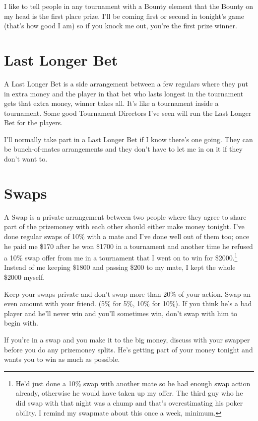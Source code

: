 I like to tell people in any tournament with a Bounty element that the
Bounty on my head is the first place prize. I'll be coming
first or second in tonight's game (that's how good I am) so if you
knock me out, you're the first prize winner.

\section{Last Longer Bet}

A Last Longer Bet is a side arrangement between a few regulars
where they put in extra money and the player
in that bet who lasts longest in the tournament gets that extra
money, winner takes all. It's like a tournament inside a tournament.
Some good Tournament Directors I've seen
will run the Last Longer Bet for the players.

I'll normally take part in a Last Longer Bet if I know there's one
going. They can be bunch-of-mates arrangements and
they don't have to let me in on it if they don't want to.

\section{Swaps}

A Swap is a private arrangement between two people where they
agree to share part of the prizemoney with each other should
either make money tonight. I've done regular swaps of 10\% with a mate and
I've done well out of them too; once he paid me
\$170 after he won \$1700 in a tournament and another time
he refused a 10\% swap offer from me in a tournament that I
went on to win for \$2000.\footnote{He'd
just done a 10\% swap with another mate so he had enough swap action
already, otherwise he would have taken up my offer. The third
guy who he did swap with that night was a chump and that's
overestimating his poker ability. I remind my swapmate about this once
a week, minimum.} Instead of me keeping \$1800 and passing \$200 to my
mate, I kept the whole \$2000 myself.

Keep your swaps private and don't swap more than 20\% of your action.
Swap an even amount with your friend. (5\% for 5\%, 10\% for 10\%).
If you think he's a bad player and he'll never win and
you'll sometimes win, don't swap with him to begin with.

If you're in a swap and you make it to the big money, discuss
with your swapper before you do any prizemoney splits. He's
getting part of your money tonight and wants you to win as
much as possible.

